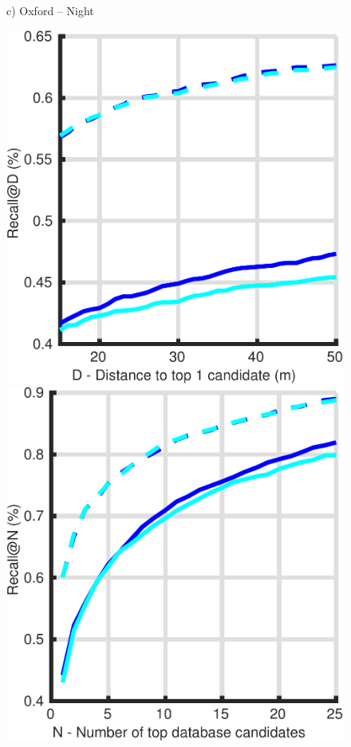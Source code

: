 \begin{figure}
\begin{minipage}{0.16\linewidth}
		c) Oxford -- Night
	\end{minipage}
	\begin{minipage}{0.16\linewidth}
		\center \scriptsize
		\includegraphics[width=\linewidth]{plot/night_ft/Results_cmu_lt/distance}	
		
		\includegraphics[width=\linewidth]{plot/night_ft/Results_cmu_lt/recall}
		

\end{minipage}
\end{figure}
